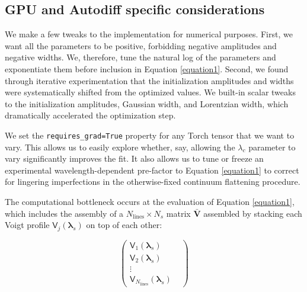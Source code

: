 \documentclass[modern]{aastex631}
\begin{document}
\subsection{GPU and Autodiff specific considerations}
We make a few tweaks to the implementation for numerical purposes. First, we want all the parameters to be positive, forbidding negative amplitudes and negative widths. We, therefore, tune the natural log of the parameters and exponentiate them before inclusion in Equation \ref{equation1}. Second, we found through iterative experimentation that the initialization amplitudes and widths were systematically shifted from the optimized values. We built-in scalar tweaks to the initialization amplitudes, Gaussian width, and Lorentzian width, which dramatically accelerated the optimization step.

We set the \texttt{requires\_grad=True} property for any Torch tensor that we want to vary. This allows us to easily explore whether, say, allowing the $\lambda_c$ parameter to vary significantly improves the fit. It also allows us to tune or freeze an experimental wavelength-dependent pre-factor to Equation \ref{equation1} to correct for lingering imperfections in the otherwise-fixed continuum flattening procedure.

The computational bottleneck occurs at the evaluation of Equation \ref{equation1}, which includes the assembly of a $N_{\mathrm{lines}}\times N_{s}$ matrix $\bm{\bar{V}}$ assembled by stacking each Voigt profile $\mathsf{V}_j(\bm{\lambda}_s)$ on top of each other:

\begin{equation}
    \begin{pmatrix}
        \mathsf{V}_1(\bm{\lambda}_s)                    & \\
        \mathsf{V}_2(\bm{\lambda}_s)                    & \\
        \vdots                                          & \\
        \mathsf{V}_{N_{\mathrm{lines}}}(\bm{\lambda}_s) &
    \end{pmatrix}
\end{equation}
\end{document}
